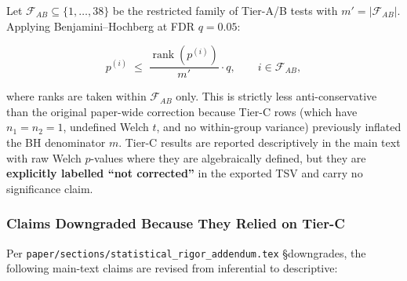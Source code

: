 \documentclass[
  american,
  11pt,
  a4paper,
  oneside]{report}
\begin{document}
Let \(\mathcal{F}_{AB} \subseteq \{1, \ldots, 38\}\) be the restricted
family of Tier-A/B tests with \(m' = |\mathcal{F}_{AB}|\). Applying
Benjamini--Hochberg at FDR \(q = 0.05\):

\[
p^{(i)} \;\le\; \frac{\operatorname{rank}(p^{(i)})}{m'} \cdot q, \qquad i \in \mathcal{F}_{AB},
\]

where ranks are taken within \(\mathcal{F}_{AB}\) only. This is strictly
less anti-conservative than the original paper-wide correction because
Tier-C rows (which have \(n_1{=}n_2{=}1\), undefined Welch \(t\), and no
within-group variance) previously inflated the BH denominator \(m\).
Tier-C results are reported descriptively in the main text with raw
Welch \(p\)-values where they are algebraically defined, but they are
\textbf{explicitly labelled ``not corrected''} in the exported TSV and
carry no significance claim.

\subsubsection{Claims Downgraded Because They Relied on
Tier-C}\label{claims-downgraded-because-they-relied-on-tier-c}

Per \texttt{paper/sections/statistical\_rigor\_addendum.tex}
§downgrades, the following main-text claims are revised from inferential
to descriptive:
\end{document}
